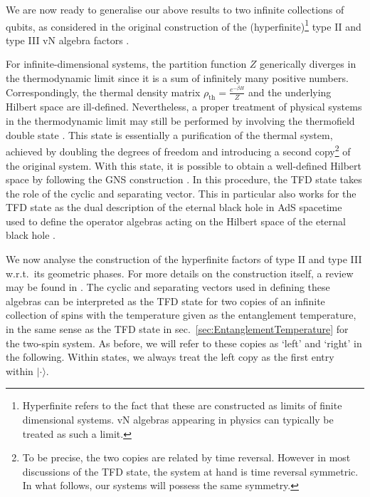 \documentclass[a4paper,11pt]{article}
\newcommand{\1}{\mathds{1}}
\begin{document}
We are now ready to generalise our above results to two infinite collections of qubits, as considered in the original construction of the (hyperfinite)\footnote{Hyperfinite refers to the fact that these are constructed as limits of finite dimensional systems. vN algebras appearing in physics can typically be treated as such a limit.} type II and type III vN algebra factors \cite{von1939infinite,powers1967representations,araki1968classification}.

For infinite-dimensional systems, the partition function $Z$ generically diverges in the thermodynamic limit since it is a sum of infinitely many positive numbers. Correspondingly, the thermal density matrix $\rho_{\text{th}}=\frac{e^{-\beta H}}{Z}$ and the underlying Hilbert space are ill-defined. Nevertheless, a proper treatment of physical systems in the thermodynamic limit may still be performed by involving the thermofield double state \cite{haag1967equilibrium}. This state is essentially a purification of the thermal system, achieved by doubling the degrees of freedom and introducing a second copy\footnote{To be precise, the two copies are related by time reversal. However in most discussions of the TFD state, the system at hand is time reversal symmetric. In what follows, our systems will possess the same symmetry.} of the original system. With this state, it is possible to obtain a well-defined Hilbert space by following the GNS construction \cite{gelfand1943imbedding,segal1947irreducible}. In this procedure, the TFD state takes the role of the cyclic and separating vector. This in particular also works for the TFD state as the dual description of the eternal black hole in AdS spacetime \cite{Maldacena:2001kr} used to define the operator algebras acting on the Hilbert space of the eternal black hole \cite{Leutheusser:2021frk,Leutheusser:2021qhd,Witten:2021unn}.

We now analyse the construction of the hyperfinite factors of type II and type III w.r.t.~its geometric phases. For more details on the construction itself, a review may be found in \cite{Witten:2018zxz}. The cyclic and separating vectors used in defining these algebras can be interpreted as the TFD state for two copies of an infinite collection of spins with the temperature given as the entanglement temperature, in the same sense as the TFD state in sec.~\ref{sec:EntanglementTemperature} for the two-spin system. As before, we will refer to these copies as `left' and `right' in the following. Within states, we always treat the left copy as the first entry within $|\cdot\rangle$. 
\end{document}
